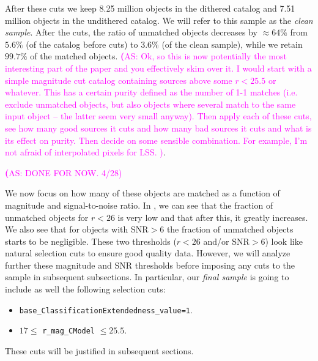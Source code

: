\documentclass[twocolumn]{aastex62}
\newcommand{\as}[1]{{\textcolor{magenta}{{\textbf (AS: #1)}}}}
\begin{document}
After these cuts we keep 8.25 million objects in the dithered catalog and 7.51 million objects in the undithered catalog. We will refer to this sample as the \textit{clean sample}. After the cuts, the ratio of unmatched objects decreases by $\approx 64\%$ from $5.6\%$ (of the catalog before cuts) to $3.6\%$ (of the clean sample), while we retain $99.7\%$ of the matched objects.  
\as{Ok, so this is now potentially the most interesting part of the paper and you effectively skim over it. I would start with a simple magnitude cut catalog containing sources above some $r<25.5$ or whatever. This has a certain purity defined as the number of 1-1 matches (i.e. exclude unmatched objects, but also objects where several match to the same input object -- the latter seem very small anyway). Then apply each of these cuts, see how many good sources it cuts and how many bad sources it cuts and what is its effect on purity. Then decide on some sensible combination. For example, I'm not afraid of interpolated pixels for LSS.
}. 

\as{DONE FOR NOW. 4/28}


We now focus on how many of these objects are matched as a function of magnitude and signal-to-noise ratio. In , we can see that the fraction of unmatched objects for $r < 26$ is very low and that after this, it greatly increases. We also see that for objects with SNR$>6$ the fraction of unmatched objects starts to be negligible. These two thresholds ($r < 26$ and/or SNR$>6$) look like natural selection cuts to ensure good quality data. However, we will analyze further these magnitude and SNR thresholds before imposing any cuts to the sample in subsequent subsections. In particular, our \textit{final sample} is going to include as well the following selection cuts:

\begin{itemize}
\item \texttt{base\_ClassificationExtendedness\_value=1}.
\item $17 \leq$ \texttt{r\_mag\_CModel} $\leq 25.5$. 
\end{itemize}

These cuts will be justified in subsequent sections.
\end{document}
